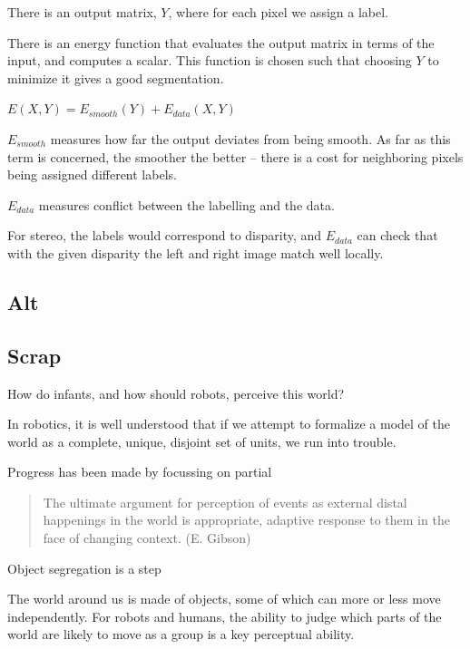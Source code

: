 There is an output matrix, $Y$, where for each pixel we assign
a label.

There is an energy function that evaluates the output matrix
in terms of the input, and computes a scalar.  This function
is chosen such that choosing $Y$ to minimize it gives a
good segmentation.

$E(X,Y) = E_{smooth}(Y) + E_{data}(X,Y)$

$E_{smooth}$ measures how far the output deviates from being
smooth.  As far as this term is concerned, the smoother the
better -- there is a cost for neighboring pixels being 
assigned different labels.

$E_{data}$ measures conflict between the labelling and
the data.  

For stereo, the labels would correspond to disparity,
and $E_{data}$ can check that with the given disparity
the left and right image match well locally.


\subsection{Alt}

\cite{gibson88exploratory}

\cite{spelke90principles}


\subsection{Scrap}


How do infants, and
how should robots, perceive this world?  

In robotics, it is well understood that if we attempt to formalize a
model of the world as a complete, unique, disjoint set of units, we
run into trouble. 

 Progress has been made by focussing on 
partial


\begin{quote}

The ultimate argument for perception of events as external distal
happenings in the world is appropriate, adaptive response to them
in the face of changing context. (E. Gibson)

\end{quote}


Object segregation is a step


The world around us is made of objects, some of which can more or less
move independently. For robots and humans, the ability to judge which
parts of the world are likely to move as a group is a key perceptual
ability.


